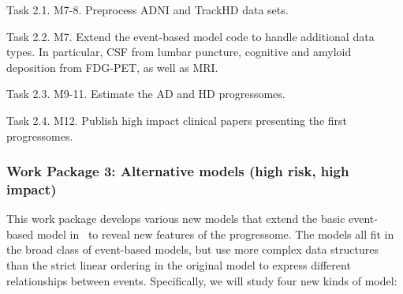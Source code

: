 \documentclass[a4paper,11pt]{article}
\begin{document}
Task 2.1. M7-8. Preprocess ADNI and TrackHD data sets.

Task 2.2. M7. Extend the event-based model code to handle additional
data types.  In particular, CSF from lumbar puncture, cognitive and
amyloid deposition from FDG-PET, as well as MRI.

Task 2.3. M9-11. Estimate the AD and HD progressomes.

Task 2.4. M12. Publish high impact clinical papers presenting the
first progressomes.

\subsubsection*{Work Package 3: Alternative models (high risk, high impact)}

This work package develops various new models that extend the basic
event-based model in~\cite{FonteijnScience11} to reveal new features
of the progressome.  The models all fit in the broad class of
event-based models, but use more complex data structures than the
strict linear ordering in the original model to express different
relationships between events.  Specifically, we will study four new
kinds of model:
\end{document}
